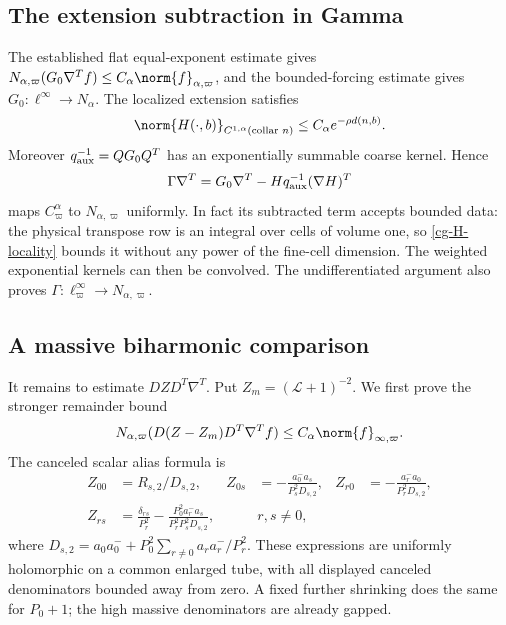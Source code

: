 \subsection{The extension subtraction in Gamma}

The established flat equal-exponent estimate gives
$N_{\alpha,\varpi}(G_0\nabla^Tf)
\le C_\alpha\norm{f}_{\alpha,\varpi}$, and the bounded-forcing
estimate gives $G_0:\ell^\infty\to N_\alpha$.
The localized extension satisfies
\begin{equation}\label{cg-H-locality}
 \norm{H(\cdot,b)}_{C^{1,\alpha}(\text{collar }n)}
       \le C_\alpha e^{-\rho d(n,b)}.
\end{equation}
Moreover $q_{\rm aux}^{-1}=QG_0Q^T$ has an exponentially
summable coarse kernel. Hence
\begin{equation}\label{cg-Gamma-derivative}
 \Gamma\nabla^T=G_0\nabla^T
          -Hq_{\rm aux}^{-1}(\nabla H)^T
\end{equation}
maps $C^\alpha_\varpi$ to $N_{\alpha,\varpi}$ uniformly.
In fact its subtracted term accepts bounded data: the physical
transpose row is an integral over cells of volume one, so
\eqref{cg-H-locality} bounds it without any power of the fine-cell
dimension. The weighted exponential kernels can then be convolved.
The undifferentiated argument also proves
$\Gamma:\ell^\infty_\varpi\to N_{\alpha,\varpi}$.

\subsection{A massive biharmonic comparison}
\label{cg-biharmonic}

It remains to estimate $DZD^T\nabla^T$. Put
$Z_m=(\mathcal L+1)^{-2}$. We first prove the stronger remainder
bound
\begin{equation}\label{cg-remainder}
 N_{\alpha,\varpi}
   (D(Z-Z_m)D^T\nabla^Tf)
       \le C_\alpha\norm{f}_{\infty,\varpi}.
\end{equation}
The canceled scalar alias formula is
\begin{align}
 Z_{00}&=R_{s,2}/D_{s,2},&
 Z_{0s}&=-\frac{a_0^-a_s}{P_s^2D_{s,2}},&
 Z_{r0}&=-\frac{a_r^-a_0}{P_r^2D_{s,2}},\nonumber\\
 Z_{rs}&=\frac{\delta_{rs}}{P_r^2}
       -\frac{P_0^2a_r^-a_s}{P_r^2P_s^2D_{s,2}},
 &&r,s\ne0,                                   \label{cg-Z-alias}
\end{align}
where $D_{s,2}=a_0a_0^-+P_0^2\sum_{r\ne0}a_ra_r^-/P_r^2$.
These expressions are uniformly holomorphic on a common enlarged
tube, with all displayed canceled denominators bounded away from
zero. A fixed further shrinking does the same for $P_0+1$;
the high massive denominators are already gapped.

